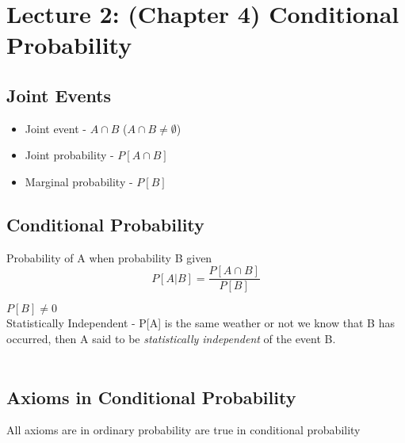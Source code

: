 \section{Lecture 2: (Chapter 4) Conditional Probability }
\subsection{Joint Events} 
\begin{itemize}
	\item Joint event - $A\cap B$ ($A\cap B \neq \emptyset$)
	\item Joint probability - $P[A\cap B]$
	\item Marginal probability - $P[B]$
\end{itemize}
\subsection{Conditional Probability}
Probability of A when probability B given 
\begin{equation}
	P[A|B]=\frac{P[A\cap B]}{P[B]}
\end{equation}
	
\emph{$P[B]\neq 0$}\\


{\color{red}Statistically Independent} - P[A] is the same weather or not we know that B has occurred, then A said to be \emph{statistically independent} of the event B.\\\\ 
\subsection{Axioms in Conditional Probability}
All axioms are in ordinary probability are true in conditional probability

